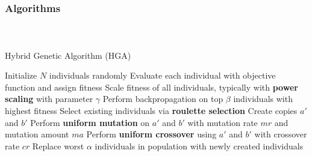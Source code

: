 \begin{frame}[t]
	\frametitle{Algorithms}
	\framesubtitle{~~}  %

\begin{algorithm}[H]
\small
\caption{Hybrid Genetic Algorithm (HGA)}
\label{alg:hga}
\begin{algorithmic}
\STATE Initialize $N$ individuals randomly
  \STATE Evaluate each individual with objective function and assign fitness
  \STATE Scale fitness of all individuals, typically with \textbf{power scaling} with parameter $\gamma$
  \STATE Perform backpropagation on top $\beta$ individuals with highest fitness
  \STATE Select existing individuals via \textbf{roulette selection}
    \STATE Create copies $a'$ and $b'$
    \STATE Perform \textbf{uniform mutation} on $a'$ and $b'$ with mutation rate $mr$ and mutation amount $ma$
    \STATE Perform \textbf{uniform crossover} using $a'$ and $b'$ with crossover rate $cr$
  \ENDFOR
  \STATE Replace worst $\alpha$ individuals in population with newly created individuals
\ENDFOR
\end{algorithmic}
\end{algorithm}

\end{frame}



